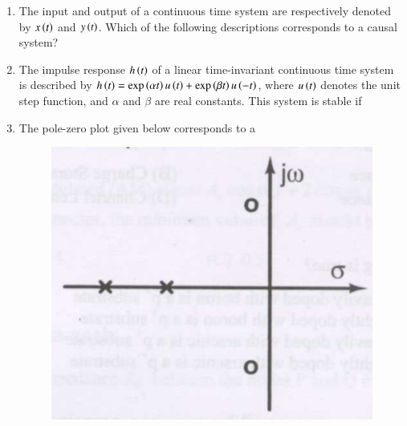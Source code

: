 \documentclass[a4paper, 11pt]{article}
\begin{document}
\begin{enumerate}
    \hfill{}

    \item The input and output of a continuous time system are respectively denoted by $x\left(t\right)$ and $y\left(t\right)$. Which of the following descriptions corresponds to a causal system?
    
    \begin{enumerate}
    \end{enumerate}
    
    \hfill{}

    \item The impulse response $h\left(t\right)$ of a linear time-invariant continuous time system is described by $h\left(t\right)=\exp\left(\alpha t\right)u\left(t\right)+\exp\left(\beta t\right)u\left(-t\right)$, where $u\left(t\right)$ denotes the unit step function, and $\alpha$ and $\beta$ are real constants. This system is stable if
    
    \begin{enumerate}
    \end{enumerate}
    
    \hfill{}

    \item The pole-zero plot given below corresponds to a
    \begin{figure}[H]
        \centering
        \includegraphics[width=0.4\columnwidth]{figs/q11.png}
        \caption*{}
        \label{fig:q11}
    \end{figure}
    

\end{enumerate}
\end{document}
